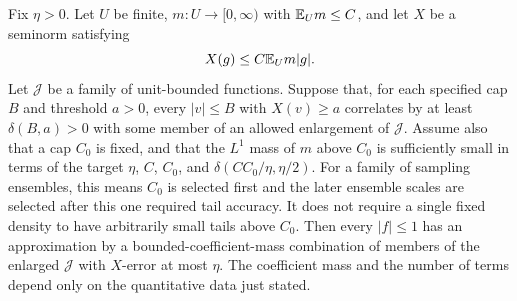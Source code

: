 \begin{lemma}
\label{cube:separation}
Fix $\eta>0$.  Let $U$ be finite, $m:U\to[0,\infty)$ with $\mathbb E_Um\le C$, and
let $X$ be a seminorm satisfying
\[
                       X(g)\le C\mathbb E_Um|g|.
\]
Let $\mathcal J$ be a family of unit-bounded functions.  Suppose
that, for each specified cap $B$ and threshold $a>0$, every
$|v|\le B$ with $X(v)\ge a$ correlates by at least
$\delta(B,a)>0$ with some member of an allowed enlargement of
$\mathcal J$.  Assume also that a cap $C_0$ is fixed, and that the $L^1$ mass
of $m$ above $C_0$ is sufficiently small in terms of the target
$\eta$, $C$, $C_0$, and $\delta(CC_0/\eta,\eta/2)$.
For a family of sampling ensembles, this means $C_0$ is selected
first and the later ensemble scales are selected after this one
required tail accuracy.  It does not require a single fixed density
to have arbitrarily small tails above $C_0$.  Then every
$|f|\le1$ has an approximation by a bounded-coefficient-mass
combination of members of the enlarged $\mathcal J$ with
$X$-error at most $\eta$.  The coefficient mass and the number of
terms depend only on the quantitative data just stated.
\end{lemma}


